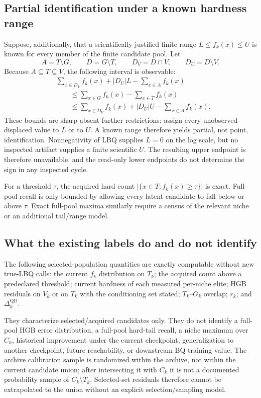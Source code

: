\subsection{Partial identification under a known hardness range}

Suppose, additionally, that a scientifically justified finite range
$L\le f_k(x)\le U$ is known for every member of the finite candidate pool.
Let
\[
 A=T\setminus G,\qquad D=G\setminus T,
 \qquad D_V=D\cap V,\qquad D_U=D\setminus V.
\]
Because $A\subseteq T\subseteq V$, the following interval is observable:
\begin{align*}
 &\sum_{x\in D_V} f_k(x)+|D_U|L-\sum_{x\in A}f_k(x)\\
 &\qquad\le
 \sum_{x\in G}f_k(x)-\sum_{x\in T}f_k(x)\\
 &\qquad\le
 \sum_{x\in D_V} f_k(x)+|D_U|U-\sum_{x\in A}f_k(x).
\end{align*}
These bounds are sharp absent further restrictions: assign every unobserved
displaced value to $L$ or to $U$.  A known range therefore yields partial,
not point, identification.  Nonnegativity of LBQ supplies $L=0$ on the log
scale, but no inspected artifact supplies a finite scientific $U$.  The
resulting upper endpoint is therefore unavailable, and the read-only lower
endpoints do not determine the sign in any inspected cycle.

For a threshold $\tau$, the acquired hard count
$|\{x\in T:f_k(x)\ge\tau\}|$ is exact.  Full-pool recall is only bounded by
allowing every latent candidate to fall below or above $\tau$.  Exact
full-pool maxima similarly require a census of the relevant niche or an
additional tail/range model.

\subsection{What the existing labels do and do not identify}

The following selected-population quantities are exactly computable without
new true-LBQ calls: the current $f_k$ distribution on $T_k$; the acquired
count above a predeclared threshold; current hardness of each measured
per-niche elite; HGB residuals on $V_k$ or on $T_k$ with the conditioning set
stated; $T_k$--$G_k$ overlap; $r_k$; and $\Delta_k^{\mathrm{QD}}$.

They characterize selected/acquired candidates only.  They do not identify a
full-pool HGB error distribution, a full-pool hard-tail recall, a niche
maximum over $C_k$, historical improvement under the current checkpoint,
generalization to another checkpoint, future reachability, or downstream BQ
training value.  The archive calibration sample is randomized within the
archive, not within the current candidate union; after intersecting it with
$C_k$ it is not a documented probability sample of $C_k\setminus T_k$.
Selected-set residuals therefore cannot be extrapolated to the union without
an explicit selection/sampling model.

